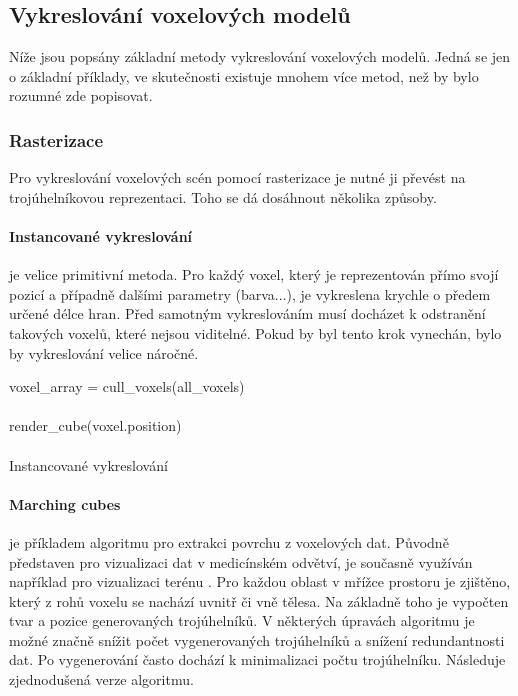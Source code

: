 \subsection{Vykreslování voxelových modelů}
Níže jsou popsány základní metody vykreslování voxelových modelů. Jedná se jen o základní příklady, ve skutečnosti existuje mnohem více metod, než by bylo rozumné zde popisovat.

\subsubsection{Rasterizace}
Pro vykreslování voxelových scén pomocí rasterizace je nutné ji převést na trojúhelníkovou reprezentaci. Toho se dá dosáhnout několika způsoby.

\paragraph{Instancované vykreslování} je velice primitivní metoda. Pro každý voxel, který je reprezentován přímo svojí pozicí a případně dalšími parametry (barva...), je vykreslena krychle o předem určené délce hran. Před samotným vykreslováním musí docházet k odstranění takových voxelů, které nejsou viditelné. Pokud by byl tento krok vynechán, bylo by vykreslování velice náročné. \cite{nousiainen_2019}

\begin{center}
	\begin{czechalgorithm}[H] \label{alg:instanced_cube}
		voxel\_array = cull\_voxels(all\_voxels)\\
		 {\\
			render\_cube(voxel.position)\\
		}\\
		\caption{Instancované vykreslování}
	\end{czechalgorithm}
\end{center}

\paragraph{Marching cubes \cite{marching_cubes}} je příkladem algoritmu pro extrakci povrchu z voxelových dat. Původně představen pro vizualizaci dat v medicínském odvětví, je současně využíván například pro vizualizaci terénu \cite{nguyen_2008}. Pro každou oblast v mřížce prostoru je zjištěno, který z rohů voxelu se nachází uvnitř či vně tělesa. Na základně toho je vypočten tvar a pozice generovaných trojúhelníků. V některých úpravách algoritmu je možné značně snížit počet vygenerovaných trojúhelníků a snížení redundantnosti dat. Po vygenerování často dochází k minimalizaci počtu trojúhelníku. Následuje zjednodušená verze algoritmu.

